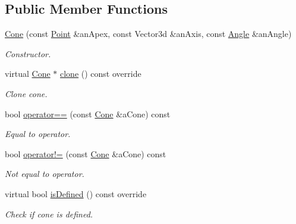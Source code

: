 \subsection*{Public Member Functions}
\begin{DoxyCompactItemize}
\item 
\hyperlink{classlibrary_1_1math_1_1geom_1_1d3_1_1objects_1_1_cone_a06829024b976d32cccc97fa2ee774670}{Cone} (const \hyperlink{classlibrary_1_1math_1_1geom_1_1d3_1_1objects_1_1_point}{Point} \&an\+Apex, const Vector3d \&an\+Axis, const \hyperlink{classlibrary_1_1math_1_1geom_1_1_angle}{Angle} \&an\+Angle)
\begin{DoxyCompactList}\small\item\em Constructor. \end{DoxyCompactList}\item 
virtual \hyperlink{classlibrary_1_1math_1_1geom_1_1d3_1_1objects_1_1_cone}{Cone} $\ast$ \hyperlink{classlibrary_1_1math_1_1geom_1_1d3_1_1objects_1_1_cone_a126e7d1918346a94032c6a925d24f045}{clone} () const override
\begin{DoxyCompactList}\small\item\em Clone cone. \end{DoxyCompactList}\item 
bool \hyperlink{classlibrary_1_1math_1_1geom_1_1d3_1_1objects_1_1_cone_a7535ef180acef7864bb3dfbb14952c7e}{operator==} (const \hyperlink{classlibrary_1_1math_1_1geom_1_1d3_1_1objects_1_1_cone}{Cone} \&a\+Cone) const
\begin{DoxyCompactList}\small\item\em Equal to operator. \end{DoxyCompactList}\item 
bool \hyperlink{classlibrary_1_1math_1_1geom_1_1d3_1_1objects_1_1_cone_a046cbc1e10c11a61e02eb5b9af904eef}{operator!=} (const \hyperlink{classlibrary_1_1math_1_1geom_1_1d3_1_1objects_1_1_cone}{Cone} \&a\+Cone) const
\begin{DoxyCompactList}\small\item\em Not equal to operator. \end{DoxyCompactList}\item 
virtual bool \hyperlink{classlibrary_1_1math_1_1geom_1_1d3_1_1objects_1_1_cone_aecfd56286894eb3f38789193a0768dc8}{is\+Defined} () const override
\begin{DoxyCompactList}\small\item\em Check if cone is defined. \end{DoxyCompactList}\item 

\end{DoxyCompactItemize}
